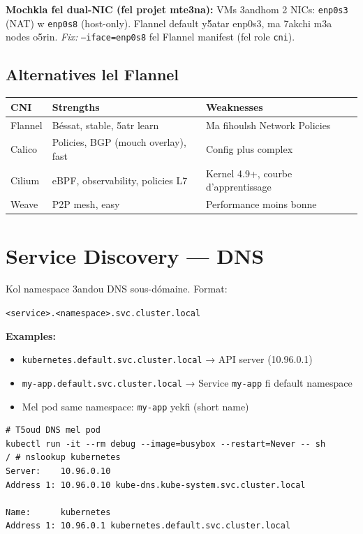 \documentclass[11pt,a4paper]{book}
\newcommand{\tuni}[1]{\textit{\color{k8sdark}#1}}
\begin{document}
\begin{warnbox}
\textbf{Mochkla fel dual-NIC (fel projet mte3na):} VMs 3andhom 2 NICs: \texttt{enp0s3} (NAT) w \texttt{enp0s8} (host-only). Flannel default y\'5atar enp0s3, ma 7akchi m3a nodes o5rin. \tuni{Fix:} \texttt{--iface=enp0s8} fel Flannel manifest (fel role \texttt{cni}).
\end{warnbox}

\subsection{Alternatives lel Flannel}

\begin{longtable}{L{2.5cm}L{5cm}L{5.5cm}}
\toprule
\textbf{CNI} & \textbf{Strengths} & \textbf{Weaknesses} \\
\midrule
Flannel & B\'essat, stable, 5atr learn & Ma fihoulsh Network Policies \\
Calico & Policies, BGP (mouch overlay), fast & Config plus complex \\
Cilium & eBPF, observability, policies L7 & Kernel 4.9+, courbe d'apprentissage \\
Weave & P2P mesh, easy & Performance moins bonne \\
\bottomrule
\end{longtable}

\section{Service Discovery --- DNS}

Kol namespace 3andou DNS sous-d\'omaine. Format:
\begin{center}
\texttt{<service>.<namespace>.svc.cluster.local}
\end{center}

\textbf{Examples:}
\begin{itemize}
  \item \texttt{kubernetes.default.svc.cluster.local} → API server (10.96.0.1)
  \item \texttt{my-app.default.svc.cluster.local} → Service \texttt{my-app} fi default namespace
  \item Mel pod same namespace: \texttt{my-app} yekfi (short name)
\end{itemize}

\begin{lstlisting}
# T5oud DNS mel pod
kubectl run -it --rm debug --image=busybox --restart=Never -- sh
/ # nslookup kubernetes
Server:    10.96.0.10
Address 1: 10.96.0.10 kube-dns.kube-system.svc.cluster.local

Name:      kubernetes
Address 1: 10.96.0.1 kubernetes.default.svc.cluster.local
\end{lstlisting}
\end{document}

